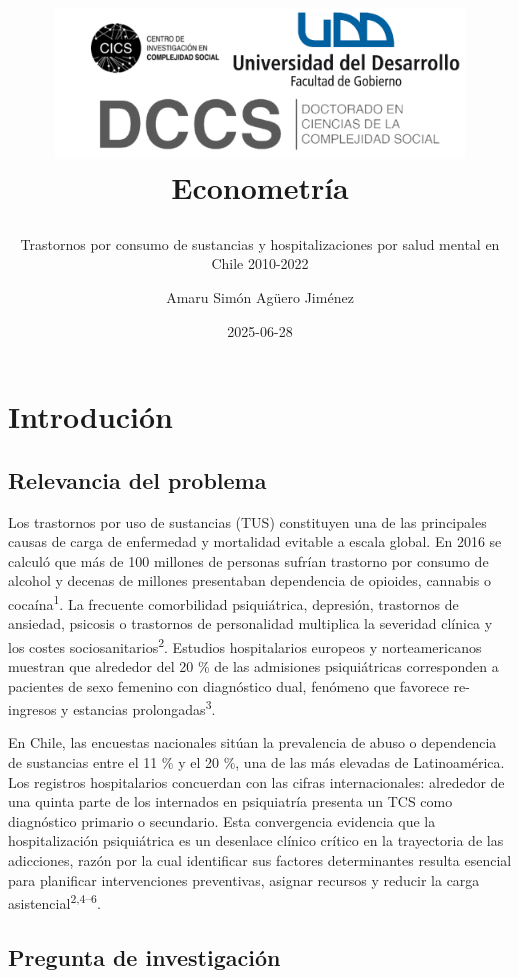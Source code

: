 \documentclass[
  spanish,
  10pt,
]{article}
\title{\begin{center}
  \includegraphics[height=4cm]{logo.png} \\[1cm]
  \Large Econometría \\
\end{center}}
\subtitle{Trastornos por consumo de sustancias y hospitalizaciones por
salud mental en Chile 2010-2022}
\author{Amaru Simón Agüero Jiménez}
\date{2025-06-28}
\renewcommand*\contentsname{Tabla de contenidos}
\newcommand\contentsname{Tabla de contenidos}
\begin{document}
\maketitle

\renewcommand*\contentsname{Tabla de contenidos}
{
\hypersetup{linkcolor=}
\setcounter{tocdepth}{3}
\tableofcontents
}

\newpage

\section{Introdución}\label{introduciuxf3n}

\subsection{Relevancia del problema}\label{relevancia-del-problema}

Los trastornos por uso de sustancias (TUS) constituyen una de las
principales causas de carga de enfermedad y mortalidad evitable a escala
global. En 2016 se calculó que más de 100 millones de personas sufrían
trastorno por consumo de alcohol y decenas de millones presentaban
dependencia de opioides, cannabis o cocaína\textsuperscript{1}. La
frecuente comorbilidad psiquiátrica, depresión, trastornos de ansiedad,
psicosis o trastornos de personalidad multiplica la severidad clínica y
los costes sociosanitarios\textsuperscript{2}. Estudios hospitalarios
europeos y norteamericanos muestran que alrededor del 20 \% de las
admisiones psiquiátricas corresponden a pacientes de sexo femenino con
diagnóstico dual, fenómeno que favorece re-ingresos y estancias
prolongadas\textsuperscript{3}.

En Chile, las encuestas nacionales sitúan la prevalencia de abuso o
dependencia de sustancias entre el 11 \% y el 20 \%, una de las más
elevadas de Latinoamérica. Los registros hospitalarios concuerdan con
las cifras internacionales: alrededor de una quinta parte de los
internados en psiquiatría presenta un TCS como diagnóstico primario o
secundario. Esta convergencia evidencia que la hospitalización
psiquiátrica es un desenlace clínico crítico en la trayectoria de las
adicciones, razón por la cual identificar sus factores determinantes
resulta esencial para planificar intervenciones preventivas, asignar
recursos y reducir la carga asistencial\textsuperscript{2,4--6}.

\subsection{Pregunta de
investigación}\label{pregunta-de-investigaciuxf3n}
\end{document}
